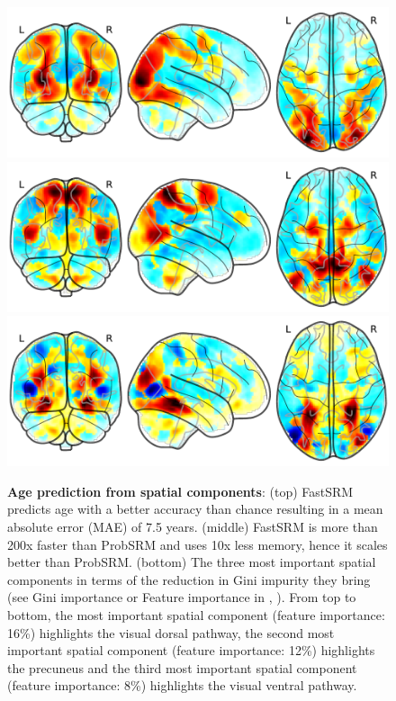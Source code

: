 \begin{figure}
\includegraphics[scale=0.365]{./figures/srm/maps_feature_imp_0_16.pdf}
\includegraphics[scale=0.365]{./figures/srm/maps_feature_imp_0_12.pdf}
\includegraphics[scale=0.365]{./figures/srm/maps_feature_imp_0_08.pdf}

\caption{\textbf{Age prediction from spatial components}: (top) FastSRM predicts
  age with a better accuracy than chance resulting in a mean absolute error (MAE) of 7.5 years. (middle) FastSRM is more than 200x faster than ProbSRM and uses 10x less memory, hence it scales better than ProbSRM. (bottom) The three most important spatial components in terms of the reduction in Gini impurity they bring (see Gini importance or Feature importance in \cite{breiman2001random}, \cite{louppe2013understanding}). From top to bottom, the most important spatial component (feature importance: 16\%) highlights the visual dorsal pathway, the second most important spatial component (feature importance: 12\%) highlights the precuneus and the third most important spatial component (feature importance: 8\%) highlights the visual ventral pathway.} 
\label{fig:predict_age}
\end{figure}

